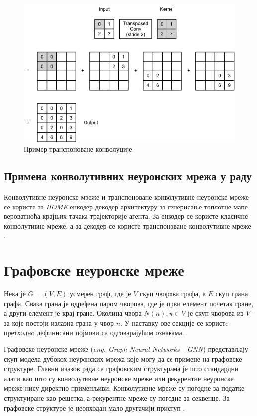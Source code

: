 \documentclass[11pt,oneside]{memoir}
\begin{document}
\begin{figure}[H]
  \centering
  \includegraphics[width=1.0\textwidth]{images/transpose_cnn.png}
  \caption{Пример транспоноване конволуције \label{transpose-ccn}}
\end{figure}

\subsection{Примена конволутивних неуронских мрежа у раду}

Конволутивне неуронске мреже и транспоноване конволутивне неуронске мреже се користе за \textit{HOME} енкодер-декодер архитектуру за
генерисање топлотне мапе вероватноћа крајњих тачака трајекторије агента. За енкодер се користе класичне конволутивне мреже, а за
декодер се користе транспоноване конволутивне мреже \cite{home}.

\section{Графовске неуронске мреже}

Нека је $G = (V, E)$ усмерен граф, где је $V$ скуп чворова графа, а $E$ скуп грана графа. Свака грана је одређена
паром чворова, где је први елемент почетак гране, а други елемент је крај гране. Околина чвора $N(n), n \in V$ је скуп чворова из $V$ 
за које постоји излазна грана у чвор $n$. У наставку ове секције се користe претходнo дефинисани појмови са одговарајућим ознакама.

Графовске неуронске мреже (\textit{eng. Graph Neural Networks - GNN}) представљају скуп модела дубокох неуронских мрежа које могу да се примене на графовске структуре.
Главни изазов рада са графовским структурама је што стандардни алати као што су конволутивне неуронске мреже или рекурентне неуронске мреже
нису директно применљиви. Конволутивне мреже су погодне за податке структуиране као решетка, а рекурентне мреже су погодне за секвенце. За 
графовске структуре је неопходан мало другачији приступ \cite{grl}. 
\end{document}

